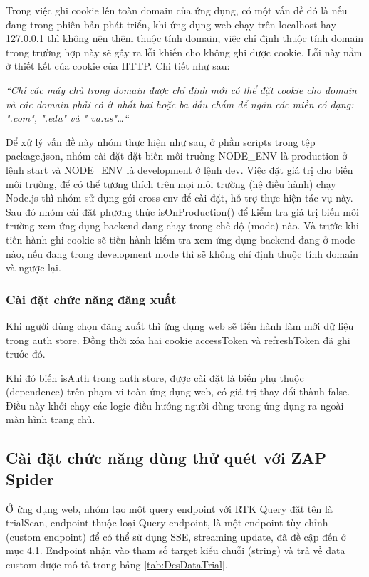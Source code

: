 Trong việc ghi cookie lên toàn domain của ứng dụng, có một vấn đề đó là nếu đang trong phiên bản phát triển, khi ứng dụng web chạy trên localhost hay 127.0.0.1 thì không nên thêm thuộc tính domain, việc chỉ định thuộc tính domain trong trường hợp này sẽ gây ra lỗi khiến cho không ghi được cookie. Lỗi này nằm ở thiết kết của cookie của HTTP. Chi tiết như sau:

\textit{“Chỉ các máy chủ trong domain được chỉ định mới có thể đặt cookie cho domain và các domain phải có ít nhất hai hoặc ba dấu chấm để ngăn các miền có dạng: ".com", ".edu" và " va.us"…“} \cite{chap4bib4}

Để xử lý vấn đề này nhóm thực hiện như sau, ở phần scripts trong tệp package.json, nhóm cài đặt đặt biến môi trường NODE\_ENV là production ở lệnh start và NODE\_ENV là development ở lệnh dev. Việc đặt giá trị cho biến môi trường, để có thể tương thích trên mọi môi trường (hệ điều hành) chạy Node.js thì nhóm sử dụng gói cross-env để cài đặt, hỗ trợ thực hiện tác vụ này. Sau đó nhóm cài đặt phương thức isOnProduction() để kiểm tra giá trị biến môi trường xem ứng dụng backend đang chạy trong chế độ (mode) nào. Và trước khi tiến hành ghi cookie sẽ tiến hành kiểm tra xem ứng dụng backend đang ở mode nào, nếu đang trong development mode thì sẽ không chỉ định thuộc tính domain và ngược lại.

\subsubsection{Cài đặt chức  năng đăng xuất}

\tab Khi người dùng chọn đăng xuất thì ứng dụng web sẽ tiến hành làm mới dữ liệu trong auth store. Đồng thời xóa hai cookie accessToken và refreshToken đã ghi trước đó.

Khi đó biến isAuth trong auth store, được cài đặt là biến phụ thuộc (dependence) trên phạm vi toàn ứng dụng web, có giá trị thay đổi thành false. Điều này khởi chạy các logic điều hướng người dùng trong ứng dụng ra ngoài màn hình trang chủ.

\subsection{Cài đặt chức năng dùng thử quét với ZAP Spider}

\tab Ở ứng dụng web, nhóm tạo một query endpoint với RTK Query đặt tên là trialScan, endpoint thuộc loại Query endpoint, là một endpoint tùy chỉnh (custom endpoint) để có thể sử dụng SSE, streaming update, đã đề cập đến ở mục 4.1.
Endpoint nhận vào tham số target kiểu chuỗi (string) và trả về data custom được mô tả trong bảng \ref{tab:DesDataTrial}.

